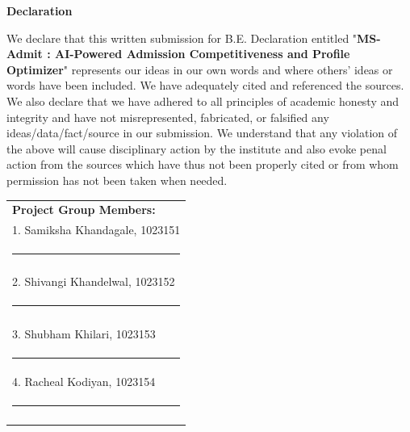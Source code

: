 
\begin{centering}
\large
{\LARGE\bf Declaration}\\
\end{centering}

\justify
We declare that this written submission for B.E. Declaration entitled 
"{\bf MS-Admit : AI-Powered Admission Competitiveness and Profile Optimizer}" represents our ideas in our own words and where others' ideas or words have been included. We have adequately cited and referenced the sources. We also declare that we have adhered to all principles of academic honesty and integrity and have not misrepresented, fabricated, or falsified any ideas/data/fact/source in our submission. We understand that any violation of the above will cause disciplinary action by the institute and also evoke penal action from the sources which have thus not been properly cited or from whom permission has not been taken when needed.  \\ 

\vspace{3cm}
\hfill%
\begin{tabular}[t]{l@{}}
\vspace{1cm}

{\textbf{Project Group Members:}} \\ 
\vspace{1cm}

1. Samiksha Khandagale, 1023151\\
\noindent\rule{5cm}{0.10pt} \\
\\
\vspace{1cm}

2. Shivangi Khandelwal, 1023152 \\
\noindent\rule{5cm}{0.10pt} \\
\\
\vspace{1cm}

3. Shubham Khilari, 1023153 \\
 \noindent\rule{5cm}{0.10pt}
\\
\vspace{1cm}

4. Racheal Kodiyan, 1023154 \\
 \noindent\rule{5cm}{0.10pt}
\\
\vspace{1cm}
\end{tabular}

